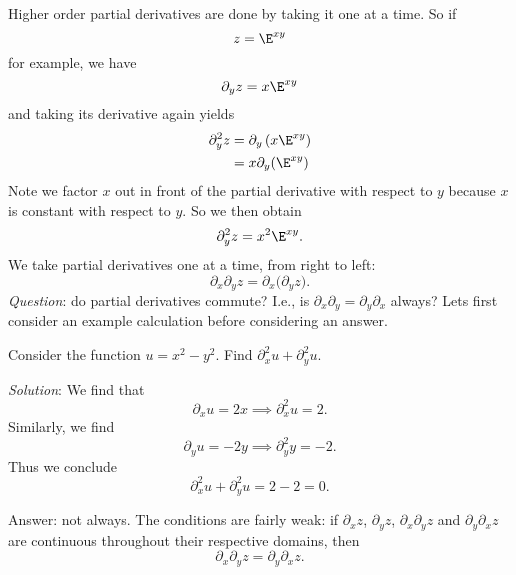 \M Higher order partial derivatives are done by taking it one at
a time. So if 
\begin{equation}
z=\E^{xy}
\end{equation}
for example, we have
\begin{equation}
\partial_{y}z=x\E^{xy}
\end{equation}
and taking its derivative again yields
\begin{equation}
\begin{aligned}
\partial_{y}^{2}z &= \partial_{y}\left(x\E^{xy}\right)\\
&=x\partial_{y}(\E^{xy})
\end{aligned}
\end{equation}
Note we factor $x$ out in front of the partial derivative with
respect to $y$ because $x$ is constant with respect to $y$. So we
then obtain
\begin{equation}
\partial_{y}^{2}z = x^{2}\E^{xy}.
\end{equation}
We take partial derivatives one at a time, from right to left:
\begin{equation}
\partial_{x}\partial_{y}z
= \partial_{x}\bigl(\partial_{y}z\bigr).
\end{equation}
\emph{Question}: do partial derivatives commute? I.e., is
$\partial_{x}\partial_{y}=\partial_{y}\partial_{x}$ always?
Lets first consider an example calculation before considering an answer.

\begin{example}
Consider the function $u=x^{2}-y^{2}$. Find
$\partial_{x}^{2}u+\partial_{y}^{2}u$.

\emph{Solution}: We find that
\begin{equation}
\partial_{x}u = 2x\implies \partial_{x}^{2}u = 2.
\end{equation}
Similarly, we find
\begin{equation}
\partial_{y}u=-2y\implies \partial_{y}^{2}y=-2.
\end{equation}
Thus we conclude
\begin{equation}
\partial_{x}^{2}u+\partial_{y}^{2}u=2-2=0.
\end{equation}
\end{example}

Answer: not always. The conditions are fairly weak: if
$\partial_{x}z$, $\partial_{y}z$, $\partial_{x}\partial_{y}z$ and
$\partial_{y}\partial_{x}z$ are continuous throughout their
respective domains, then 
\begin{equation}
\partial_{x}\partial_{y}z = \partial_{y}\partial_{x}z.
\end{equation}




